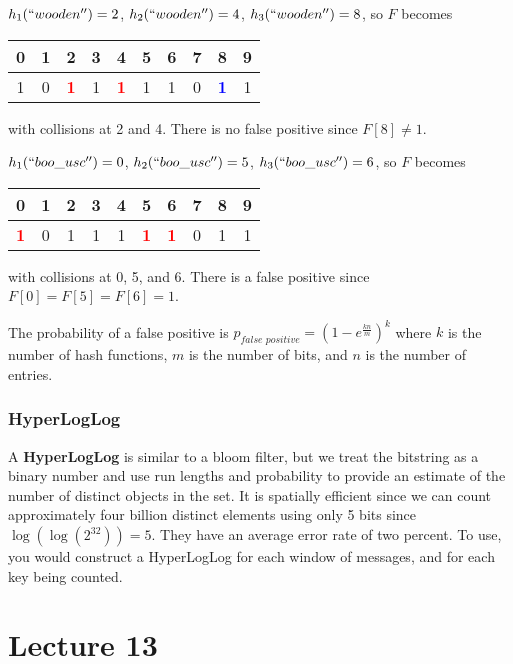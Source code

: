 \documentclass{report}
\newenvironment{example}{\begin{tcolorbox}[title={Example},colback=green!5!white,colframe=black!75!green]}{\end{tcolorbox}}
\renewcommand{\bf}[1]{\textbf{{#1}}}
\renewcommand{\it}[1]{\textit{{#1}}}
\begin{document}
\begin{example}
    {
        $h_1(``wooden'') = 2$, $h_2(``wooden'') = 4$, $h_3(``wooden'') = 8$, so $F$
        becomes
        \centering
        \begin{tabular}{cccccccccc}
            0 & 1 & 2 & 3 & 4 & 5 & 6 & 7 & 8 & 9 \\
            \hline
            1 & 0 & \textcolor{red}{\bf{1}} & 1 & \textcolor{red}{\bf{1}} & 1 & 1 & 0 & \textcolor{blue}{\bf{1}} & 1 \\
        \end{tabular}
        \par
        with collisions at 2 and 4. There is no false positive since $F[8] \neq 1$.
        \vspace{1em}
    }

    {
        $h_1(``boo\_usc'') = 0$, $h_2(``boo\_usc'') = 5$, $h_3(``boo\_usc'') = 6$, so $F$
        becomes
        \centering
        \begin{tabular}{cccccccccc}
            0 & 1 & 2 & 3 & 4 & 5 & 6 & 7 & 8 & 9 \\
            \hline
            \textcolor{red}{\bf{1}} & 0 & 1 & 1 & 1 & \textcolor{red}{\bf{1}} & \textcolor{red}{\bf{1}} & 0 & 1 & 1 \\
        \end{tabular}
        \par
        with collisions at 0, 5, and 6. There is a false positive since
        $F[0] = F[5] = F[6] = 1$.
    }
\end{example}

The probability of a false positive is
$p_{\it{false positive}} = (1 - e^{\frac{kn}{m}})^k$ where $k$ is the number of
hash functions, $m$ is the number of bits, and $n$ is the number of entries.

\subsection{HyperLogLog}
A \bf{HyperLogLog} is similar to a bloom filter, but we treat the bitstring as a
binary number and use run lengths and probability to provide an estimate of the
number of distinct objects in the set. It is spatially efficient since we can
count approximately four billion distinct elements using only 5 bits since
$\log(\log(2^{32})) = 5$. They have an average error rate of two percent. To
use, you would construct a HyperLogLog for each window of messages, and for each
key being counted.


\chapter{Lecture 13}
\end{document}
